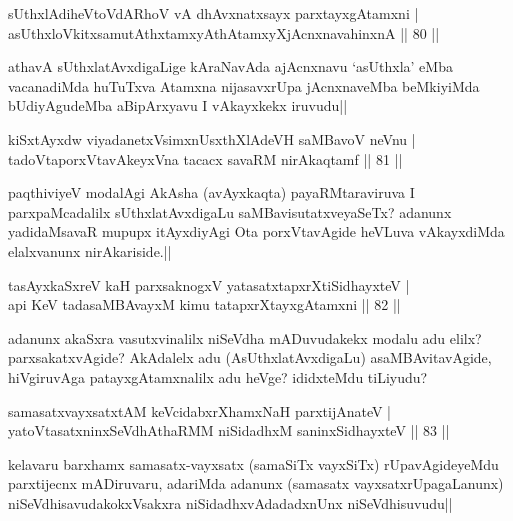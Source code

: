 \begin{shl}
sUthxlAdiheVtoVdARhoV vA dhAvxnatxsayx parxtayxgAtamxni |\\
asUthxloVkitxsamutAthxtamxyAthAtamxyXjAcnxnavahinxnA \hfill || 80 ||
\end{shl}

\begin{artha}
athavA sUthxlatAvxdigaLige kAraNavAda ajAcnxnavu `asUthxla' eMba vacanadiMda huTuTxva Atamxna nijasavxrUpa jAcnxnaveMba beMkiyiMda bUdiyAgudeMba aBipArxyavu I vAkayxkekx iruvudu||
\end{artha}


\begin{shl}
kiSxtAyxdw viyadanetxV\s simxnUsxthXlAdeVH saMBavoV neVnu |\\
tadoVtaporxVtavAkeyxVna tacacx savaRM nirAkaqtamf \hfill || 81 ||
\end{shl}

\begin{artha}%
paqthiviyeV modalAgi AkAsha (avAyxkaqta) payaRMtaraviruva I parxpaMcadalilx sUthxlatAvxdigaLu saMBavisutatxveyaSeTx? adanunx yadidaMsavaR mupupx itAyxdiyAgi Ota porxVtavAgide heVLuva vAkayxdiMda elalxvanunx nirAkariside.||
\end{artha}


\begin{shl}
tasAyxkaSxreV kaH parxsaknogxV yatasatxtapxrXtiSidhayxteV |\\
api KeV tadasaMBAvayxM kimu tatapxrXtayxgAtamxni \hfill || 82 ||
\end{shl}

\begin{artha}
adanunx akaSxra vasutxvinalilx niSeVdha mADuvudakekx modalu adu elilx? parxsakatxvAgide? AkAdalelx adu (AsUthxlatAvxdigaLu) asaMBAvitavAgide, hiVgiruvAga patayxgAtamxnalilx adu heVge? ididxteMdu tiLiyudu?
\end{artha}


\begin{shl}
samasatxvayxsatxtAM keVcidabxrXhamxNaH parxtijAnateV |\\
yatoV\s tasatxninxSeVdhAthaRMM niSidadhxM saninxSidhayxteV \hfill || 83 ||
\end{shl}

\begin{artha}
kelavaru barxhamx samasatx-vayxsatx (samaSiTx vayxSiTx) rUpavAgideyeMdu parxtijecnx mADiruvaru, adariMda adanunx (samasatx vayxsatxrUpagaLanunx) niSeVdhisavudakokxVsakxra niSidadhxvAdadadxnUnx niSeVdhisuvudu||
\end{artha}

